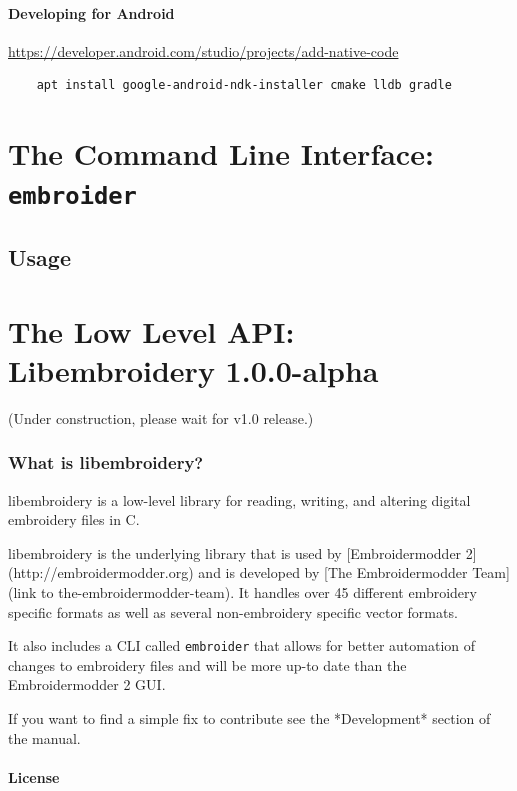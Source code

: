 \documentclass[a4paper, 11pt]{report}
\newcommand{\libembversion}{1.0.0-alpha}
\begin{document}
\subsubsection{Developing for Android}

\url{https://developer.android.com/studio/projects/add-native-code}

\begin{verbatim}
    apt install google-android-ndk-installer cmake lldb gradle
\end{verbatim}

\chapter{The Command Line Interface: \texttt{embroider}}

\section{Usage}


\chapter{The Low Level API: Libembroidery \libembversion}

(Under construction, please wait for v1.0 release.)

\subsection{What is libembroidery?}

libembroidery is a low-level library for reading, writing, 
and altering digital embroidery files in C.

libembroidery is the underlying library that is used by [Embroidermodder 2](http://embroidermodder.org)
and is developed by [The Embroidermodder Team](link to the-embroidermodder-team).
It handles over 45 different embroidery specific formats as well
as several non-embroidery specific vector formats.

It also includes a CLI called \texttt{embroider} that allows for better automation of
changes to embroidery files and will be more up-to date than
the Embroidermodder 2 GUI.

If you want to find a simple fix to contribute see the *Development* section
of the manual.

\subsubsection{ License}
\end{document}

